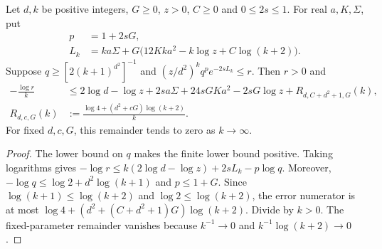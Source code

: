 \begin{theorem}
    \label{thm:sharp_bell_logarithmic_rate}
    \leanok
    Let $d,k$ be positive integers, $G\ge0$, $z>0$, $C\ge0$ and
    $0\le2s\le1$. For real $a,K,\Sigma$, put
    \begin{align*}
        p&=1+2sG,\\
        L_k&=ka\Sigma+G\bigl(12Kka^2-k\log z+C\log(k+2)\bigr).
    \end{align*}
    Suppose $q\ge[2(k+1)^{d^2}]^{-1}$ and
    $(z/d^2)^kq^p e^{-2sL_k}\le r$. Then $r>0$ and
    \begin{align*}
        -\frac{\log r}{k}
        &\le 2\log d-\log z+2sa\Sigma+24sGKa^2-2sG\log z
          +R_{d,C+d^2+1,G}(k),\\
        R_{d,c,G}(k)
        &:=\frac{\log4+(d^2+cG)\log(k+2)}{k}.
    \end{align*}
    For fixed $d,c,G$, this remainder tends to zero as $k\to\infty$.
\end{theorem}
\begin{proof}
    \leanok
    The lower bound on $q$ makes the finite lower bound positive. Taking
    logarithms gives
    $-\log r\le k(2\log d-\log z)+2sL_k-p\log q$.
    Moreover, $-\log q\le\log2+d^2\log(k+1)$ and $p\le1+G$.
    Since $\log(k+1)\le\log(k+2)$ and $\log2\le\log(k+2)$, the error numerator
    is at most $\log4+(d^2+(C+d^2+1)G)\log(k+2)$. Divide by $k>0$.
    The fixed-parameter remainder vanishes because $k^{-1}\to0$ and
    $k^{-1}\log(k+2)\to0$.
\end{proof}

